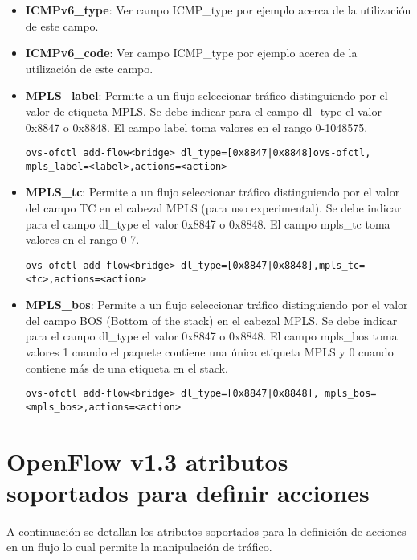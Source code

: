 \begin{itemize}
\item \textbf{ICMPv6\_type}: Ver campo ICMP\_type por ejemplo acerca de la utilización de este campo. 

\item \textbf{ICMPv6\_code}: Ver campo ICMP\_type por ejemplo acerca de la utilización de este campo. 

\item \textbf{MPLS\_label}:  Permite a un flujo seleccionar tr\'afico distinguiendo por el valor de etiqueta MPLS. Se debe indicar para el campo dl\_type el valor 0x8847 o 0x8848. El campo label toma valores en el rango 0-1048575.

\begin{center}
\texttt{ovs-ofctl add-flow<bridge> dl\_type=[0x8847|0x8848]ovs-ofctl, mpls\_label=<label>,actions=<action>}
\end{center}

\item \textbf{MPLS\_tc}: Permite a un flujo seleccionar tr\'afico distinguiendo por el valor del campo TC en el cabezal MPLS (para uso experimental). Se debe indicar para el campo dl\_type el valor 0x8847 o 0x8848. El campo mpls\_tc toma valores en el rango 0-7.

\begin{center}
\texttt{ovs-ofctl add-flow<bridge> dl\_type=[0x8847|0x8848],mpls\_tc=<tc>,actions=<action>}
\end{center}

\item \textbf{MPLS\_bos}: Permite a un flujo seleccionar tr\'afico distinguiendo por el valor del campo BOS (Bottom of the stack) en el cabezal MPLS. Se debe indicar para el campo dl\_type el valor 0x8847 o 0x8848. El campo mpls\_bos toma valores 1 cuando el paquete contiene una única etiqueta MPLS y 0 cuando contiene m\'as de una etiqueta en el stack.

\begin{center}
\texttt{ovs-ofctl add-flow<bridge> dl\_type=[0x8847|0x8848], mpls\_bos=<mpls\_bos>,actions=<action>}
\end{center}

\end{itemize}

\section{OpenFlow v1.3 atributos soportados para definir acciones}
A continuaci\'on se detallan los atributos soportados para la definici\'on de acciones en un flujo lo cual permite la manipulaci\'on de tr\'afico.

